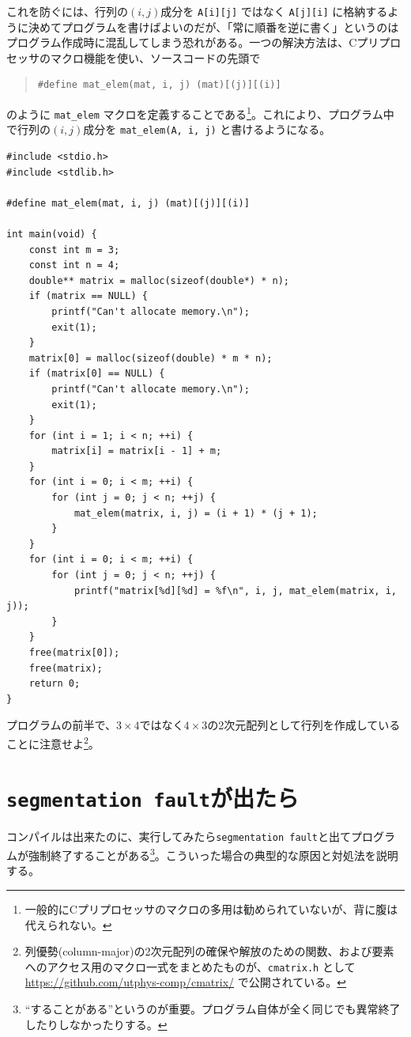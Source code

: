 これを防ぐには、行列の\((i,j)\)成分を \texttt{A[i][j]} ではなく \texttt{A[j][i]} に格納するように決めてプログラムを書けばよいのだが、「常に順番を逆に書く」というのはプログラム作成時に混乱してしまう恐れがある。一つの解決方法は、Cプリプロセッサのマクロ機能を使い、ソースコードの先頭で
\begin{quote}
    \begin{verbatim}
#define mat_elem(mat, i, j) (mat)[(j)][(i)]
\end{verbatim}
\end{quote}
のように \texttt{mat\_elem} マクロを定義することである\footnote{一般的にCプリプロセッサのマクロの多用は勧められていないが、背に腹は代えられない。}。これにより、プログラム中で行列の\((i,j)\)成分を \texttt{mat\_elem(A, i, j)} と書けるようになる。
\begin{reidai}\label{ex:malloc-2dim-column-major}
    \begin{verbatim}
#include <stdio.h>
#include <stdlib.h>

#define mat_elem(mat, i, j) (mat)[(j)][(i)]

int main(void) {
    const int m = 3;
    const int n = 4;
    double** matrix = malloc(sizeof(double*) * n);
    if (matrix == NULL) {
        printf("Can't allocate memory.\n");
        exit(1);
    }
    matrix[0] = malloc(sizeof(double) * m * n);
    if (matrix[0] == NULL) {
        printf("Can't allocate memory.\n");
        exit(1);
    }
    for (int i = 1; i < n; ++i) {
        matrix[i] = matrix[i - 1] + m;
    }
    for (int i = 0; i < m; ++i) {
        for (int j = 0; j < n; ++j) {
            mat_elem(matrix, i, j) = (i + 1) * (j + 1);
        }
    }
    for (int i = 0; i < m; ++i) {
        for (int j = 0; j < n; ++j) {
            printf("matrix[%d][%d] = %f\n", i, j, mat_elem(matrix, i, j));
        }
    }
    free(matrix[0]);
    free(matrix);
    return 0;
}
\end{verbatim}
\end{reidai} \noindent
プログラムの前半で、\(3 \times 4\)ではなく\(4 \times 3\)の2次元配列として行列を作成していることに注意せよ\footnote{列優勢(column-major)の2次元配列の確保や解放のための関数、および要素へのアクセス用のマクロ一式をまとめたものが、\hypertarget{cmatrix}{\texttt{cmatrix.h}} として\url{https://github.com/utphys-comp/cmatrix/} で公開されている。}。

\section{\texttt{segmentation fault}が出たら}
コンパイルは出来たのに、実行してみたら\texttt{segmentation fault}と出てプログラムが強制終了することがある\footnote{``することがある''というのが重要。プログラム自体が全く同じでも異常終了したりしなかったりする。}。こういった場合の典型的な原因と対処法を説明する。

